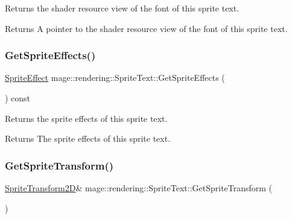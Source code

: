 Returns the shader resource view of the font of this sprite text.

\begin{DoxyReturn}{Returns}
A pointer to the shader resource view of the font of this sprite text. 
\end{DoxyReturn}
\mbox{\label{classmage_1_1rendering_1_1_sprite_text_ad9a7ac6ba55ae87a1849b3f1e8e6892b}} 
\subsubsection{\texorpdfstring{Get\+Sprite\+Effects()}{GetSpriteEffects()}}
{\footnotesize\ttfamily \mbox{\hyperlink{namespacemage_1_1rendering_a4dbc3536c87b906f1d41d863ec458e78}{Sprite\+Effect}} mage\+::rendering\+::\+Sprite\+Text\+::\+Get\+Sprite\+Effects (\begin{DoxyParamCaption}{ }\end{DoxyParamCaption}) const\hspace{0.3cm}{\ttfamily [noexcept]}}

Returns the sprite effects of this sprite text.

\begin{DoxyReturn}{Returns}
The sprite effects of this sprite text. 
\end{DoxyReturn}
\mbox{\label{classmage_1_1rendering_1_1_sprite_text_ab137a046c56306d06741491d459dd1a2}} 
\subsubsection{\texorpdfstring{Get\+Sprite\+Transform()}{GetSpriteTransform()}\hspace{0.1cm}{\footnotesize\ttfamily [1/2]}}
{\footnotesize\ttfamily \mbox{\hyperlink{classmage_1_1_sprite_transform2_d}{Sprite\+Transform2D}}\& mage\+::rendering\+::\+Sprite\+Text\+::\+Get\+Sprite\+Transform (\begin{DoxyParamCaption}{ }\end{DoxyParamCaption})\hspace{0.3cm}{\ttfamily [noexcept]}}

